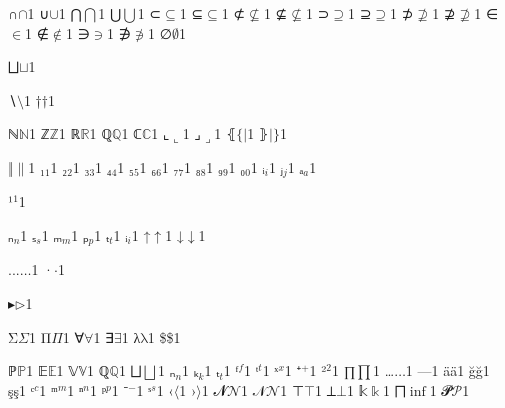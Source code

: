 {  {∩}{{\ensuremath{\cap}}}1
  {∪}{{\ensuremath{\cup}}}1
  {⋂}{{\ensuremath{\bigcap}}}1
  {⋃}{{\ensuremath{\bigcup}}}1
  {⊂}{{\ensuremath{\subseteq}}}1
  {⊆}{{\ensuremath{\subseteq}}}1
  {⊄}{{\ensuremath{\nsubseteq}}}1
  {⊈}{{\ensuremath{\nsubseteq}}}1
  {⊃}{{\ensuremath{\supseteq}}}1
  {⊇}{{\ensuremath{\supseteq}}}1
  {⊅}{{\ensuremath{\nsupseteq}}}1
  {⊉}{{\ensuremath{\nsupseteq}}}1
  {∈}{{\ensuremath{\in}}}1
  {∉}{{\ensuremath{\notin}}}1
  {∋}{{\ensuremath{\ni}}}1
  {∌}{{\ensuremath{\notni}}}1
  {∅}{{\ensuremath{\emptyset}}}1

  {⨆}{{\ensuremath{\sqcup}}}1

  {∖}{{\ensuremath{\setminus}}}1
  {†}{{\ensuremath{\dag}}}1

  {ℕ}{{\ensuremath{\mathbb{N}}}}1
  {ℤ}{{\ensuremath{\mathbb{Z}}}}1
  {ℝ}{{\ensuremath{\mathbb{R}}}}1
  {ℚ}{{\ensuremath{\mathbb{Q}}}}1
  {ℂ}{{\ensuremath{\mathbb{C}}}}1
  {⌞}{{\ensuremath{\llcorner}}}1
  {⌟}{{\ensuremath{\lrcorner}}}1
  {⦃}{{\ensuremath{\{\!|}}}1
  {⦄}{{\ensuremath{|\!\}}}}1

  {‖}{{\ensuremath{\|}}}1
  {₁}{{\ensuremath{_1}}}1
  {₂}{{\ensuremath{_2}}}1
  {₃}{{\ensuremath{_3}}}1
  {₄}{{\ensuremath{_4}}}1
  {₅}{{\ensuremath{_5}}}1
  {₆}{{\ensuremath{_6}}}1
  {₇}{{\ensuremath{_7}}}1
  {₈}{{\ensuremath{_8}}}1
  {₉}{{\ensuremath{_9}}}1
  {₀}{{\ensuremath{_0}}}1
  {ᵢ}{{\ensuremath{_i}}}1
  {ⱼ}{{\ensuremath{_j}}}1
  {ₐ}{{\ensuremath{_a}}}1

  {¹}{{\ensuremath{^1}}}1

  {ₙ}{{\ensuremath{_n}}}1
  {ₛ}{{\ensuremath{_s}}}1
  {ₘ}{{\ensuremath{_m}}}1
  {ₚ}{{\ensuremath{_p}}}1
  {ₜ}{{\ensuremath{_t}}}1
  {ᵢ}{{\ensuremath{_i}}}1
  {↑}{{\ensuremath{\uparrow}}}1
  {↓}{{\ensuremath{\downarrow}}}1

  {...}{{\ensuremath{\ldots}}}1
  {·}{{\ensuremath{\cdot}}}1

  {▸}{{\ensuremath{\triangleright}}}1

  {Σ}{{\ensuremath{\Sigma}}}1
  {Π}{{\ensuremath{\Pi}}}1
  {∀}{{\ensuremath{\forall}}}1
  {∃}{{\ensuremath{\exists}}}1
  {λ}{{\ensuremath{\mathrm{\lambda}}}}1
  {\$}{{\$}}1

  {ℙ}{{\ensuremath{\mathbb{P}}}}1
  {𝔼}{{\ensuremath{\mathbb{E}}}}1
  {𝕍}{{\ensuremath{\mathbb{V}}}}1
  {ℚ}{{\ensuremath{\mathbb{Q}}}}1
  {⨆}{{\ensuremath{\bigsqcup}}}1
  {ₙ}{{\ensuremath{_n}}}1
  {ₖ}{{\ensuremath{_k}}}1
  {ₜ}{{\ensuremath{_t}}}1
  {ᶠ}{{\ensuremath{^f}}}1
  {ᵗ}{{\ensuremath{^t}}}1
  {ˣ}{{\ensuremath{^x}}}1
  {⁺}{{\ensuremath{^+}}}1
  {²}{{\ensuremath{^2}}}1
  {∏}{{\ensuremath{\prod}}}1
  {…}{{\ensuremath{\dots}}}1
  {—}{{\textemdash}}1
  {ä}{{\"a}}1
  {ğ}{{\u{g}}}1
  {ş}{{\c{s}}}1
  {ᶜ}{{\ensuremath{^c}}}1
  {ᵐ}{{\ensuremath{^m}}}1
  {ⁿ}{{\ensuremath{^n}}}1
  {ᵖ}{{\ensuremath{^p}}}1
  {⁻}{{\ensuremath{^-}}}1
  {ˢ}{{\ensuremath{^s}}}1
  {‹}{{\ensuremath{\langle}}}1
  {›}{{\ensuremath{\rangle}}}1
  {𝓝}{{\ensuremath{\mathcal{N}}}}1
  {𝒩}{{\ensuremath{\mathcal{N}}}}1
  {⊤}{{\ensuremath{\top}}}1
  {⟂}{{\ensuremath{\bot}}}1
  {𝕜}{{\ensuremath{\Bbbk}}}1
  {⨅}{{\ensuremath{\inf}}}1
  {𝓟}{{\ensuremath{\mathcal{P}}}}1

}

